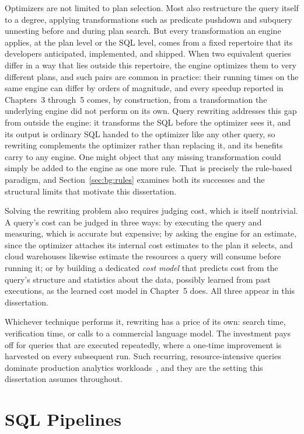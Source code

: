 Optimizers are not limited to plan selection. Most also restructure
the query itself to a degree, applying transformations such as
predicate pushdown and subquery unnesting before and during plan
search. But every transformation an engine applies, at the plan
level or the SQL level, comes from a fixed repertoire that its
developers anticipated, implemented, and shipped. When two
equivalent queries differ in a way that lies outside this
repertoire, the engine optimizes them to very different plans, and
such pairs are common in practice: their running times on the same
engine can differ by orders of magnitude, and every speedup reported
in Chapters~3 through~5 comes, by construction, from a
transformation the underlying engine did not perform on its own.
Query rewriting addresses this gap from outside the engine: it
transforms the SQL before the optimizer sees it, and its output is
ordinary SQL handed to the optimizer like any other query, so
rewriting complements the optimizer rather than replacing it, and
its benefits carry to any engine. One might object that any missing
transformation could simply be added to the engine as one more
rule. That is precisely the rule-based paradigm, and
Section~\ref{sec:bg:rules} examines both its successes and the
structural limits that motivate this dissertation.

Solving the rewriting problem also requires judging cost, which is
itself nontrivial. A query's cost can be judged in three ways: by
executing the query and measuring, which is accurate but expensive;
by asking the engine for an estimate, since the optimizer attaches
its internal cost estimates to the plan it selects, and cloud
warehouses likewise estimate the resources a query will consume
before running it; or by building a dedicated \emph{cost model} that
predicts cost from the query's structure and statistics about the
data, possibly learned from past executions, as the learned cost
model in Chapter~5 does. All three appear in this dissertation.

Whichever technique performs it, rewriting has a price of its own:
search time, verification time, or calls to a commercial language
model. The investment pays off for queries that are executed
repeatedly, where a one-time improvement is harvested on every
subsequent run. Such recurring, resource-intensive queries dominate
production analytics
workloads~\cite{jindal2018selecting,dbtcasestudy1,dbtcasestudy2}, and
they are the setting this dissertation assumes throughout.

\section{SQL Pipelines}
\label{sec:bg:pipelines}

